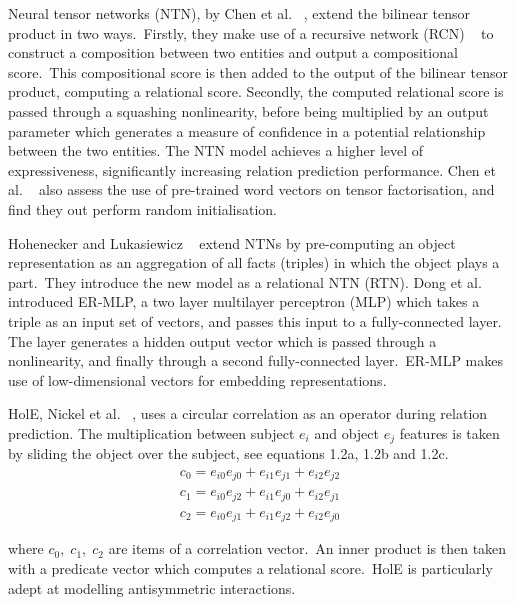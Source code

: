 \noindent Neural tensor networks (NTN), by Chen et al. \unskip~\citep{socher2013reasoning}, extend the bilinear tensor product in two ways.\ Firstly, they make use of a recursive network (RCN) \unskip~\citep{socher2012semantic} to construct a composition between two entities and output a compositional score.\ This compositional score is then added to the output of the bilinear tensor product, computing a relational score. Secondly, the computed relational score is passed through a squashing nonlinearity, before being multiplied by an output parameter which generates a measure of confidence in a potential relationship between the two entities. The NTN model achieves a higher level of expressiveness, significantly increasing relation prediction performance. Chen et al. \unskip~\citep{socher2013reasoning} also assess the use of pre-trained word vectors on tensor factorisation, and find they out perform random initialisation. \par

\noindent Hohenecker and Lukasiewicz \unskip~\citep{hohenecker2017deep} extend NTNs by pre-computing an object representation as an aggregation of all facts (triples) in which the object plays a part.\ They introduce the new model as a relational NTN (RTN). Dong et al. \unskip~\citep{dong2014knowledge} introduced ER-MLP, a two layer multilayer perceptron (MLP) which takes a triple as an input set of vectors, and passes this input to a fully-connected layer. The layer generates a hidden output vector which is passed through a nonlinearity, and finally through a second fully-connected layer.\ ER-MLP makes use of low-dimensional vectors for embedding representations. \par

\noindent HolE, Nickel et al. \unskip~\citep{nickel2016holographic}, uses a circular correlation as an operator during relation prediction. The multiplication between subject $ e_i $ and object $ e_j $ features is taken by sliding the object over the subject, see equations 1.2a, 1.2b and 1.2c. 
\begin{subequations}
	\begin{gather}
		c_0 =  e_{i0}e_{j0} + e_{i1}e_{j1} + e_{i2}e_{j2} \\
		c_1 =  e_{i0}e_{j2} + e_{i1}e_{j0} + e_{i2}e_{j1} \\
		c_2 =  e_{i0}e_{j1} + e_{i1}e_{j2} + e_{i2}e_{j0} 
	\end{gather}
\end{subequations}

\noindent where $ c_0, \; c_1, \; c_2 $ are items of a correlation vector.\ An inner product is then taken with a predicate vector which computes a relational score.\ HolE is particularly adept at modelling antisymmetric interactions. \par

